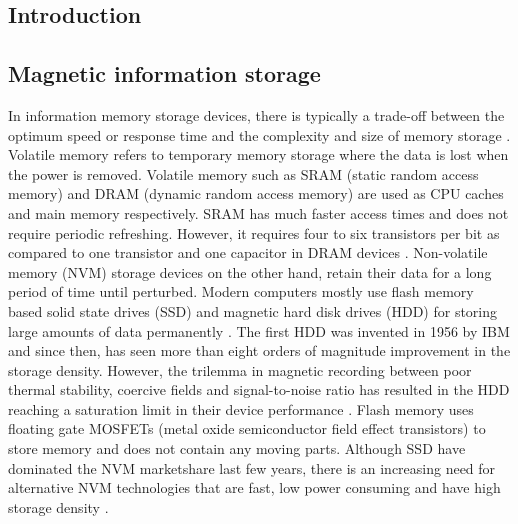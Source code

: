 \documentclass[10pt,doublespacing,edeposit]{uiucthesis2020}
\begin{document}
\begin{mainmatter}

\chapter{Introduction}

\section{Magnetic information storage}

In information memory storage devices, there is typically a trade-off between the optimum speed or response time and the complexity and size of memory storage \cite{Wing1986}. Volatile memory refers to temporary memory storage where the data is lost when the power is removed. Volatile memory such as SRAM (static random access memory) and DRAM (dynamic random access memory) are used as CPU caches and main memory respectively. SRAM has much faster access times and does not require periodic refreshing. However, it requires four to six transistors per bit as compared to one transistor and one capacitor in DRAM devices \cite{Meena2014}. Non-volatile memory (NVM) storage devices on the other hand, retain their data for a long period of time until perturbed. Modern computers mostly use flash memory based solid state drives (SSD) and magnetic hard disk drives (HDD) for storing large amounts of data permanently \cite{Meena2014}. The first HDD was invented in 1956 by IBM and since then, has seen more than eight orders of magnitude improvement in the storage density. However, the trilemma in magnetic recording between poor thermal stability, coercive fields and signal-to-noise ratio has resulted in the HDD reaching a saturation limit in their device performance \cite{Krishnan2016}. Flash memory uses floating gate MOSFETs (metal oxide semiconductor field effect transistors) to store memory and does not contain any moving parts. Although SSD have dominated the NVM marketshare last few years, there is an increasing need for alternative NVM technologies that are fast, low power consuming and have high storage density \cite{Meena2014}.


\end{mainmatter}
\end{document}
